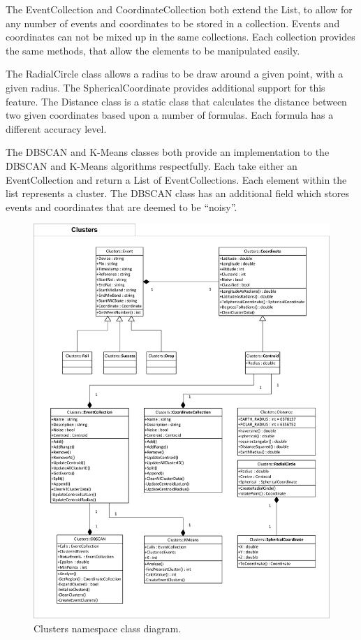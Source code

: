 The EventCollection and CoordinateCollection both extend the List, to allow for 
any number of events and coordinates to be stored in a collection. Events and 
coordinates can not be mixed up in the same collections. Each collection 
provides the same methods, that allow the elements to be manipulated easily.

The RadialCircle class allows a radius to be draw around a given point, with a 
given radius. The SphericalCoordinate provides additional support for this 
feature. The Distance class is a static class that calculates the distance 
between two given coordinates based upon a number of formulas. Each formula has 
a different accuracy level.

The DBSCAN and K-Means classes both provide an implementation to the DBSCAN and
K-Means algorithms respectfully. Each take either an EventCollection and return 
a List of EventCollections. Each element within the list represents a cluster. 
The DBSCAN class has an additional field which stores events and coordinates 
that are deemed to be ``noisy''.

\begin{figure}[H]
  \centering
    \includegraphics[scale=0.9]{chapter7/class_diagrams/clusters_namespace.png}
    \caption[Clusters namespace class diagram]
            {Clusters namespace class diagram.}
    \label{fig:NSClusters}
\end{figure}


